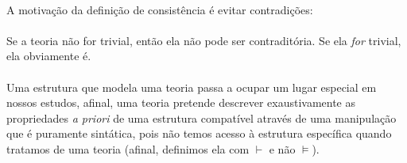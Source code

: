         \paragraph{}
            A motivação da definição de consistência é evitar contradições: 
            \begin{prooftree}



            \end{prooftree}
        \paragraph{}
            Se a teoria não for trivial, então ela não pode ser 
            contraditória. Se ela \emph{for} trivial, ela  
            obviamente é.
        \paragraph{}
            Uma estrutura que modela uma teoria passa a ocupar um 
            lugar especial em nossos estudos, afinal, uma teoria 
            pretende descrever exaustivamente as propriedades 
            \emph{a priori} de uma estrutura compatível através de 
            uma manipulação que é puramente sintática, pois não temos 
            acesso à estrutura específica quando tratamos de uma 
            teoria (afinal, definimos ela com $\vdash$ e não $\vDash$).